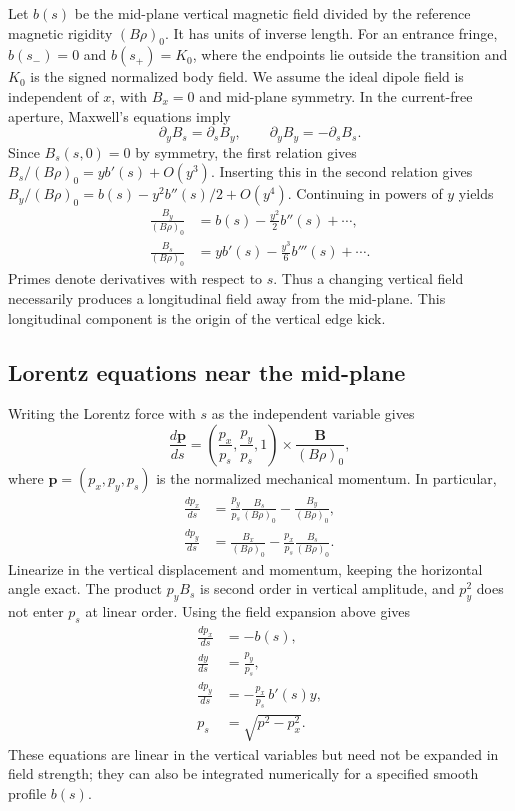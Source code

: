 Let $b(s)$ be the mid-plane vertical magnetic field divided by the reference
magnetic rigidity $(B\rho)_0$. It has units of inverse length. For an
entrance fringe, $b(s_-)=0$ and $b(s_+)=K_0$, where the endpoints lie outside
the transition and $K_0$ is the signed normalized body field. We assume the
ideal dipole field is independent of $x$, with $B_x=0$ and mid-plane
symmetry. In the current-free aperture, Maxwell's equations imply
\begin{equation}
 \partial_y B_s=\partial_s B_y,\qquad
 \partial_y B_y=-\partial_s B_s.
\end{equation}
Since $B_s(s,0)=0$ by symmetry, the first relation gives
$B_s/(B\rho)_0=y b'(s)+O(y^3)$. Inserting this in the second relation gives
$B_y/(B\rho)_0=b(s)-y^2b''(s)/2+O(y^4)$. Continuing in powers of $y$ yields
\begin{align}
 \frac{B_y}{(B\rho)_0}&=b(s)-\frac{y^2}{2}b''(s)+\cdots,
 \label{eq:fringe_fields}\\
 \frac{B_s}{(B\rho)_0}&=y b'(s)-\frac{y^3}{6}b'''(s)+\cdots.
\end{align}
Primes denote derivatives with respect to $s$. Thus a changing vertical
field necessarily produces a longitudinal field away from the mid-plane.
This longitudinal component is the origin of the vertical edge kick.

\subsection{Lorentz equations near the mid-plane}

Writing the Lorentz force with $s$ as the independent variable gives
\begin{equation}
 \frac{d\boldsymbol p}{ds}
 =\left(\frac{p_x}{p_s},\frac{p_y}{p_s},1\right)
   \mathbin{\times}\frac{\boldsymbol B}{(B\rho)_0},
\end{equation}
where $\boldsymbol p=(p_x,p_y,p_s)$ is the normalized mechanical momentum.
In particular,
\begin{align}
 \frac{dp_x}{ds}
 &=\frac{p_y}{p_s}\frac{B_s}{(B\rho)_0}
   -\frac{B_y}{(B\rho)_0},
 \label{eq:fringe_lorentz_px}\\
 \frac{dp_y}{ds}
 &=\frac{B_x}{(B\rho)_0}
   -\frac{p_x}{p_s}\frac{B_s}{(B\rho)_0}.
 \label{eq:fringe_lorentz_py}
\end{align}
Linearize in the vertical displacement and momentum, keeping the horizontal
angle exact. The product $p_y B_s$ is second order in vertical amplitude,
and $p_y^2$ does not enter $p_s$ at linear order. Using the field expansion
above gives
\begin{align}
 \frac{dp_x}{ds}&=-b(s),
 \label{eq:fringe_ode_px}\\
 \frac{dy}{ds}&=\frac{p_y}{p_s},
 \label{eq:fringe_ode_y}\\
 \frac{dp_y}{ds}&=-\frac{p_x}{p_s}\,b'(s)y,
 \label{eq:fringe_ode_py}\\
 p_s&=\sqrt{p^2-p_x^2}.
 \label{eq:fringe_longitudinal_momentum}
\end{align}
These equations are linear in the vertical variables but need not be
expanded in field strength; they can also be integrated numerically for a
specified smooth profile $b(s)$.

